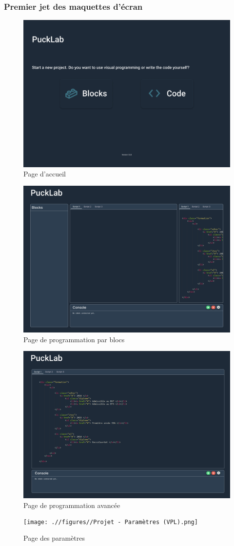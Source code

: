 \subsubsection{Premier jet des maquettes d'écran} \label{sec:écrans_v1}

\begin{figure}[H]
    \centering
    \includegraphics[width=0.75\linewidth]{.//figures//Lancement.png}
    \caption{\label{fig:v1_homepage} Page d'accueil}
\end{figure}

\begin{figure}[H]
    \centering
    \includegraphics[width=0.75\linewidth]{.//figures//Projet - VPL.png}
    \caption{\label{fig:v1_vpl_page} Page de programmation par blocs}
\end{figure}

\begin{figure}[H]
    \centering
    \includegraphics[width=0.75\linewidth]{.//figures//Projet - IDE.png}
    \caption{\label{fig:v1_ide_page} Page de programmation avancée}
\end{figure}

\begin{figure}[H]
    \centering
    \texttt{[image: .//figures//Projet - Paramètres (VPL).png]}
    \caption{\label{fig:v1_settings_page} Page des paramètres}
\end{figure}

